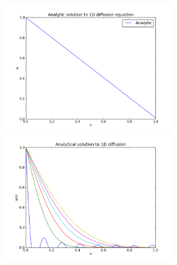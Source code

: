 \documentclass[a4paper, 12pt, titlepage]{article}
\begin{document}
\begin{section}
    \includegraphics[width=0.55\textwidth]{build-main-Desktop-Debug/Analytic_1d.png}
    \includegraphics[width=0.55\textwidth]{build-main-Desktop-Debug/Analytic_1d_first6.png}
    
     
 \end{section}
\end{document}
